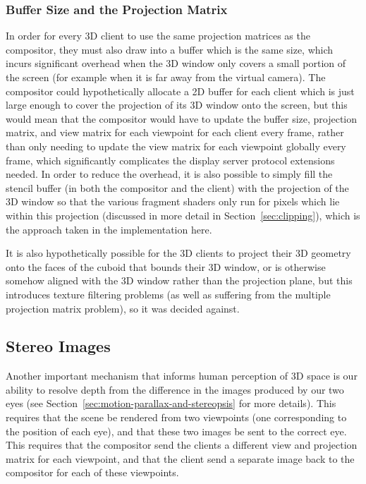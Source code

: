 \subsubsection{Buffer Size and the Projection Matrix}

In order for every 3D client to use the same projection matrices as the compositor, they must also draw into a buffer which is the same size, which incurs significant overhead when the 3D window only covers a small portion of the screen (for example when it is far away from the virtual camera). The compositor could hypothetically allocate a 2D buffer for each client which is just large enough to cover the projection of its 3D window onto the screen, but this would mean that the compositor would have to update the buffer size, projection matrix, and view matrix for each viewpoint for each client every frame, rather than only needing to update the view matrix for each viewpoint globally every frame, which significantly complicates the display server protocol extensions needed. In order to reduce the overhead, it is also possible to simply fill the stencil buffer (in both the compositor and the client) with the projection of the 3D window so that the various fragment shaders only run for pixels which lie within this projection (discussed in more detail in Section~\ref{sec:clipping}), which is the approach taken in the implementation here.

It is also hypothetically possible for the 3D clients to project their 3D geometry onto the faces of the cuboid that bounds their 3D window, or is otherwise somehow aligned with the 3D window rather than the projection plane, but this introduces texture filtering problems (as well as suffering from the multiple projection matrix problem), so it was decided against.

\subsection{Stereo Images}
Another important mechanism that informs human perception of 3D space is our ability to resolve depth from the difference in the images produced by our two eyes (see Section~\ref{sec:motion-parallax-and-stereopsis} for more details). This requires that the scene be rendered from two viewpoints (one corresponding to the position of each eye), and that these two images be sent to the correct eye. This requires that the compositor send the clients a different view and projection matrix for each viewpoint, and that the client send a separate image back to the compositor for each of these viewpoints. 

